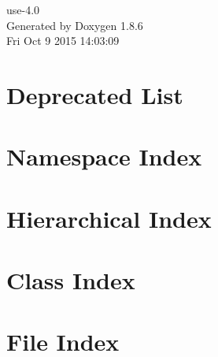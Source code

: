 \documentclass[twoside]{book}
\newcommand{\clearemptydoublepage}{%
  \newpage{\pagestyle{empty}\cleardoublepage}%
}
\begin{document}
\hypersetup{pageanchor=false}
\begin{titlepage}
\vspace*{7cm}
\begin{center}%
{\Large use-\/4.0 }\\
\vspace*{1cm}
{\large Generated by Doxygen 1.8.6}\\
\vspace*{0.5cm}
{\small Fri Oct 9 2015 14:03:09}\\
\end{center}
\end{titlepage}
\clearemptydoublepage
\tableofcontents
\clearemptydoublepage
{}
\hypersetup{pageanchor=true}

\chapter{Deprecated List}
\label{deprecated}
\hypertarget{deprecated}{}

\chapter{Namespace Index}

\chapter{Hierarchical Index}

\chapter{Class Index}

\chapter{File Index}

\end{document}
